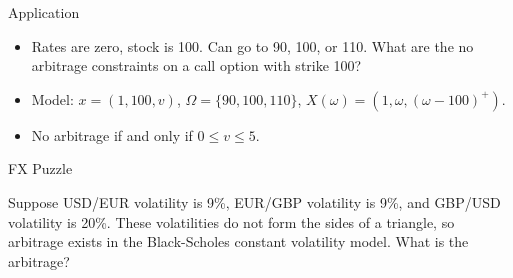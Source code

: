 \documentclass[pdf,colorBG,slideColor,blends]{prosper}
\begin{document}
\begin{slide}{Application}

\begin{itemize}

\item Rates are zero, stock is 100. Can go to 90, 100, or 110.  What are
the no arbitrage constraints on a call option with strike 100?

\item Model: $x = (1, 100, v)$, $\Omega = \{90, 100, 110\}$,
$X(\omega) = (1, \omega, (\omega - 100)^+)$. 

\item No arbitrage if and only if $0\le v\le 5$.

\end{itemize}

\end{slide}

\begin{slide}{FX Puzzle}

Suppose USD/EUR volatility is 9\%, EUR/GBP volatility is
9\%, and GBP/USD volatility is 20\%. These volatilities
do not form the sides of a triangle, so arbitrage exists
in the Black-Scholes constant volatility model.
What is the arbitrage?

\end{slide}
\end{document}

